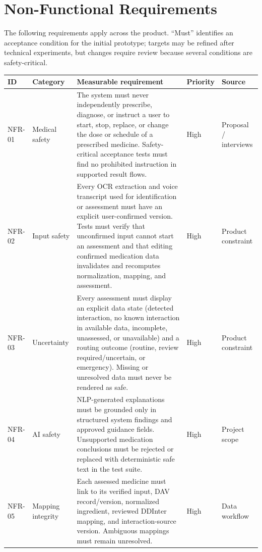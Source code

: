 \section{Non-Functional Requirements}

The following requirements apply across the product. ``Must'' identifies an
acceptance condition for the initial prototype; targets may be refined after
technical experiments, but changes require review because several conditions
are safety-critical.

\begin{longtable}{|L{0.08\textwidth}|L{0.17\textwidth}|L{0.43\textwidth}|L{0.10\textwidth}|L{0.12\textwidth}|}
\hline
\textbf{ID} & \textbf{Category} & \textbf{Measurable requirement} & \textbf{Priority} & \textbf{Source}\\ \hline
NFR-01 & Medical safety & The system must never independently prescribe, diagnose, or instruct a user to start, stop, replace, or change the dose or schedule of a prescribed medicine. Safety-critical acceptance tests must find no prohibited instruction in supported result flows. & High & Proposal / interviews\\ \hline
NFR-02 & Input safety & Every OCR extraction and voice transcript used for identification or assessment must have an explicit user-confirmed version. Tests must verify that unconfirmed input cannot start an assessment and that editing confirmed medication data invalidates and recomputes normalization, mapping, and assessment. & High & Product constraint\\ \hline
NFR-03 & Uncertainty & Every assessment must display an explicit data state (detected interaction, no known interaction in available data, incomplete, unassessed, or unavailable) and a routing outcome (routine, review required/uncertain, or emergency). Missing or unresolved data must never be rendered as safe. & High & Product constraint\\ \hline
NFR-04 & AI safety & NLP-generated explanations must be grounded only in structured system findings and approved guidance fields. Unsupported medication conclusions must be rejected or replaced with deterministic safe text in the test suite. & High & Project scope\\ \hline
NFR-05 & Mapping integrity & Each assessed medicine must link to its verified input, DAV record/version, normalized ingredient, reviewed DDInter mapping, and interaction-source version. Ambiguous mappings must remain unresolved. & High & Data workflow\\ \hline

\end{longtable}
